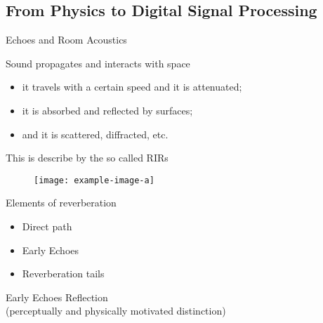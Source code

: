 \subsection{From Physics to Digital Signal Processing}

\begin{frame}{Echoes and Room Acoustics}

    \begin{block}{Sound propagates and interacts with space}
        \begin{itemize}
            \item it \alert{travels} with a certain speed and it is \alert{attenuated};
            \item it is \alert{absorbed} and \alert{reflected} by surfaces;
            \item and it is scattered, diffracted, etc.
        \end{itemize}
    This is describe by the so called RIRs
    \end{block}

    \begin{figure}
        \centering
        \texttt{[image: example-image-a]}
    \end{figure}

    \begin{block}{Elements of reverberation}
        \begin{itemize}
            \item Direct path
            \item \alert{Early Echoes}
            \item Reverberation tails
        \end{itemize}

    \end{block}


    \begin{mydefblock}{Early Echoes}
        Reflection
        \\(perceptually and physically motivated distinction)
    \end{mydefblock}

\end{frame}

